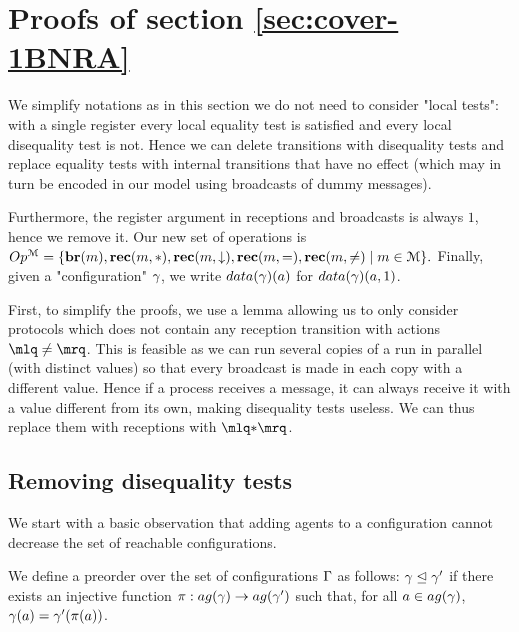 
\section{Proofs of section \ref{sec:cover-1BNRA}}
\label{app:cover-one-reg}

	We simplify notations as in this section we do not need to consider "local tests": with a single register every local equality test is satisfied and every local disequality test is not.
Hence we can delete transitions with disequality tests and replace equality tests with internal transitions that have no effect (which may in turn be encoded in our model using broadcasts of dummy messages). 

Furthermore, the register argument in receptions and broadcasts is always $1$, hence we remove it.
Our new set of operations is 
$
Op^{\mathcal{M}} = \{\textbf{br}(m), \textbf{rec}(m, {*}), \textbf{rec}(m, \downarrow), \textbf{rec}(m, {=}), \textbf{rec}(m, {\ne}) \mid m \in \mathcal{M}\}.
$
Finally, given a "configuration" $\gamma$, we write $\data{\config}(a)$ for $\data{\config}(a,1)$. 

First, to simplify the proofs, we use a lemma allowing us to only consider protocols which does not contain any reception transition with actions $\quotemarks{\ne}$. This is feasible as we can run several copies of a run in parallel (with distinct values) so that every broadcast is made in each copy with a different value. Hence if a process receives a message, it can always receive it with a value different from its own, making disequality tests useless. We can thus replace them with receptions with $\quotemarks{\dummyact}$. 




\subsection{Removing disequality tests}
\label{sec:one-diseq-tests}

We start with a basic observation that adding agents to a configuration cannot decrease the set of reachable configurations.


\begin{definition}
	We define a preorder over the set of configurations $\Gamma$ as follows: $\gamma \trianglelefteq \gamma'$ if there exists an injective function $\pi: \agentsof{\config} \rightarrow \agentsof{\config'}$ such that, for all $a \in \agentsof{\config}$, $\gamma(a) = \gamma'(\pi(a))$. 
\end{definition}

